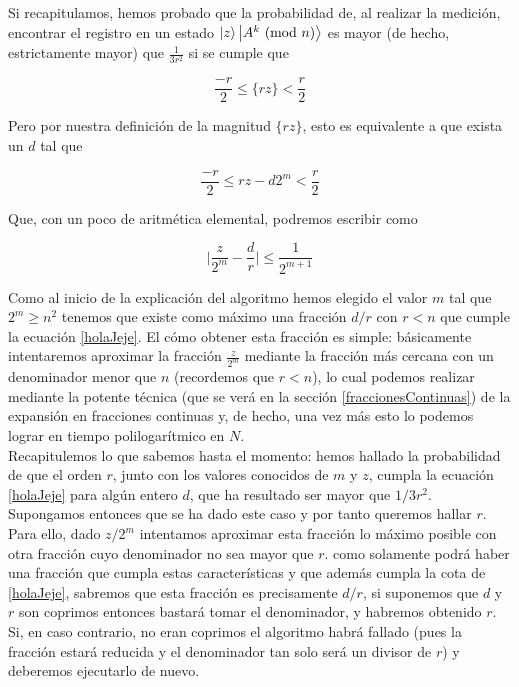 \documentclass[11pt, spanish]{report}
\numberwithin{equation}{section}
\numberwithin{defin}{section}
\begin{document}

Si recapitulamos, hemos probado que la probabilidad de, al realizar la medición, encontrar el registro en un estado $\ket{z}\ket{A^k\ (\text{mod }n)}$ es mayor (de hecho, estrictamente mayor) que $\frac{1}{3r^2}$ si se cumple que

\begin{equation}
\frac{-r}{2}\leq \{rz\} < \frac{r}{2}
\end{equation}

Pero por nuestra definición de la magnitud $\{rz\}$, esto es equivalente a que exista un $d$ tal que

\begin{equation}
\frac{-r}{2}\leq rz-d2^m < \frac{r}{2}
\end{equation}

Que, con un poco de aritmética elemental, podremos escribir como

\begin{equation}\label{holaJeje}
\Big|\frac{z}{2^m}-\frac{d}{r}\Big|\leq\frac{1}{2^{m+1}}
\end{equation}

Como al inicio de la explicación del algoritmo hemos elegido el valor $m$ tal que $2^m\geq n^2$ tenemos que existe como máximo una fracción $d/r$ con $r<n$ que cumple la ecuación \ref{holaJeje}. El cómo obtener esta fracción es simple: básicamente intentaremos aproximar la fracción $\frac{z}{2^m}$ mediante la fracción más cercana con un denominador menor que $n$ (recordemos que $r<n$), lo cual podemos realizar mediante la potente técnica (que se verá en la sección \ref{fraccionesContinuas}) de la expansión en fracciones continuas y, de hecho, una vez más esto lo podemos lograr en tiempo polilogarítmico en $N$.\\

Recapitulemos lo que sabemos hasta el momento: hemos hallado la probabilidad de que el orden $r$, junto con los valores conocidos de $m$ y $z$, cumpla la ecuación \ref{holaJeje} para algún entero $d$, que ha resultado ser mayor que $1/3r^2$. Supongamos entonces que se ha dado este caso y por tanto queremos hallar $r$. Para ello, dado $z/2^m$ intentamos aproximar esta fracción lo máximo posible con otra fracción cuyo denominador no sea mayor que $r$.  como solamente podrá haber una fracción que cumpla estas características y que además cumpla la cota de \ref{holaJeje}, sabremos que esta fracción es precisamente $d/r$, si suponemos que $d$ y $r$ son coprimos entonces bastará tomar el denominador, y habremos obtenido $r$. Si, en caso contrario, no eran coprimos el algoritmo habrá fallado (pues la fracción estará reducida y el denominador tan solo será un divisor de $r$) y deberemos ejecutarlo de nuevo.\\
\end{document}
